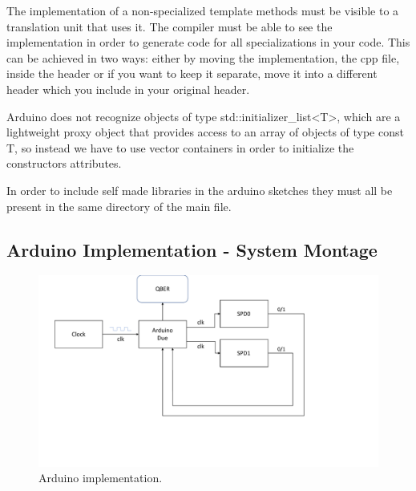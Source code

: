 \begin{refsection}
The implementation of a non-specialized template methods must be visible to a translation unit that uses it. The compiler must be able to see the implementation in order to generate code for all specializations in your code. This can be achieved in two ways: either by moving the implementation, the cpp file, inside the header or if you want to keep it separate, move it into a different header which you include in your original header.

Arduino does not recognize objects of type std::initializer\_list<T>, which are a lightweight proxy object that provides access to an array of objects of type const T, so instead we have to use vector containers in order to initialize the constructors attributes.

In order to include self made libraries in the arduino sketches they must all be present in the same directory of the main file.


\subsection{Arduino Implementation - System Montage}
\begin{figure}[H]
	\centering
	\includegraphics[width=1\linewidth]{./sdf/arduino_quantum_rx/figures/montageDiagram.pdf}
	\caption{Arduino implementation.}
	\label{montage}
\end{figure}


\end{refsection}
